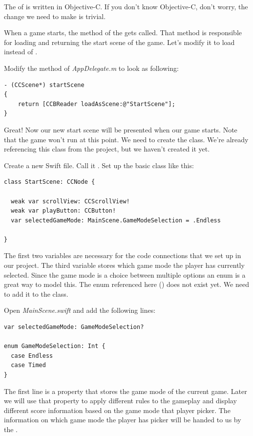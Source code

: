 The  of \cocos{} is written in Objective-C. If you don't
know Objective-C, don't worry, the change we need to make is trivial.

When a \cocos{} game starts, the  method of the
 gets called. That method is responsible for loading and
returning the start scene of the game. Let's modify it to load
 instead of .

\begin{leftbar}
Modify the  method of \textit{AppDelegate.m} to look as
following:
\begin{lstlisting}
- (CCScene*) startScene
{
    return [CCBReader loadAsScene:@"StartScene"];
}
\end{lstlisting}
\end{leftbar}
Great! Now our new start scene will be presented when our game starts. Note
that the game won't run at this point. We need to create the
 class. We're already referencing this class from the
\SB{} project, but we haven't created it yet.

\begin{leftbar}
Create a new Swift file. Call it . Set up the basic
 class like this:
\begin{lstlisting}
class StartScene: CCNode {
  
  weak var scrollView: CCScrollView!
  weak var playButton: CCButton!
  var selectedGameMode: MainScene.GameModeSelection = .Endless
  
}
\end{lstlisting}
\end{leftbar}
The first two variables are necessary for the code connections that we set up
in our \SB{} project. The third variable stores which game mode the player has
currently selected. Since the game mode is a choice between multiple options an
enum is a great way to model this. The enum referenced here
() does not exist yet. We need to add it to the
 class.

\begin{leftbar}
Open \textit{MainScene.swift} and add the following lines:
\begin{lstlisting}
var selectedGameMode: GameModeSelection?
  
enum GameModeSelection: Int {
  case Endless
  case Timed
}
\end{lstlisting}
\end{leftbar}
The first line is a property that stores the game mode of the current game.
Later we will use that property to apply different rules to the gameplay and
display different score information based on the game mode that player picker.
The information on which game mode the player has picker will be handed to us by
the .

